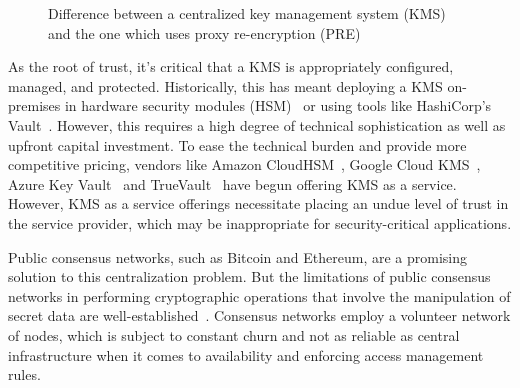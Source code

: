 \documentclass[longbibliography,nofootinbib]{revtex4-1}
\begin{document}
\begin{figure}
    \centering
    \qquad
    \qquad
    \caption{Difference between a centralized key management system (KMS) and the one which uses proxy re-encryption (PRE)}
    \label{fig:kms}
\end{figure}


As the root of trust, it's critical that a KMS is appropriately configured, managed, and protected.
Historically, this has meant deploying a KMS on-premises in hardware security modules (HSM)~\cite{wiki:hsm} or using tools like
HashiCorp's Vault~\cite{web:hashicorp-vault}.
However, this requires a high degree of technical sophistication as well as upfront capital investment.
To ease the technical burden and provide more competitive pricing, vendors like Amazon CloudHSM~\cite{web:aws-cloudhsm},
Google Cloud KMS~\cite{web:google-cloud-kms}, Azure Key Vault~\cite{web:azure-key-vault} and TrueVault~\cite{web:truevault}
have begun offering KMS as a service.
However, KMS as a service offerings necessitate placing an undue level of trust in the service provider, which may
be inappropriate for security-critical applications.

Public consensus networks, such as Bitcoin and Ethereum, are a promising solution to this centralization problem.
But the limitations of public consensus networks in performing cryptographic operations that involve the manipulation of secret
data are well-established~\cite{cryptoeprint:2017:201}. Consensus networks employ a volunteer network of nodes,
which is subject to constant churn and not as reliable as central infrastructure when it comes to availability and
enforcing access management rules.
\end{document}
